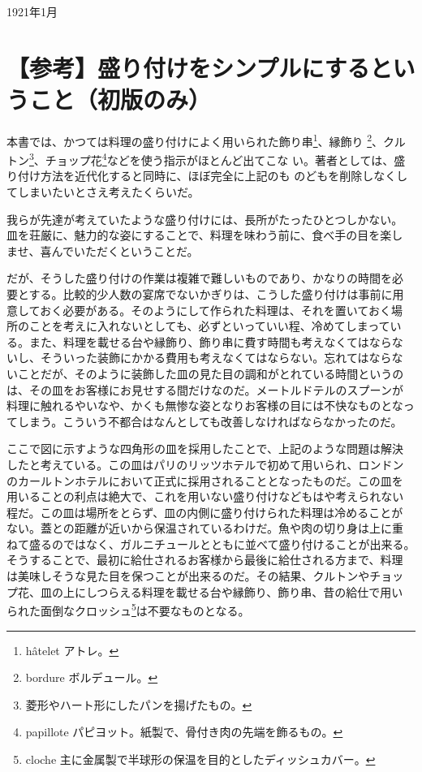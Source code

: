 \begin{flushright}
1921年1月
\end{flushright}

\newpage
\small
{}

\hypertarget{ux53c2ux8003ux76dbux308aux4ed8ux3051ux3092ux30b7ux30f3ux30d7ux30ebux306bux3059ux308bux3068ux3044ux3046ux3053ux3068ux521dux7248ux306eux307f}{%
\section{【参考】盛り付けをシンプルにするということ（初版のみ）}\label{ux53c2ux8003ux76dbux308aux4ed8ux3051ux3092ux30b7ux30f3ux30d7ux30ebux306bux3059ux308bux3068ux3044ux3046ux3053ux3068ux521dux7248ux306eux307f}}

本書では、かつては料理の盛り付けによく用いられた飾り串\footnote{hâtelet
  アトレ。}、縁飾り \footnote{bordure ボルデュール。}、クルトン\footnote{菱形やハート形にしたパンを揚げたもの。}、チョップ花\footnote{papillote
  パピヨット。紙製で、骨付き肉の先端を飾るもの。}などを使う指示がほとんど出てこな
い。著者としては、盛り付け方法を近代化すると同時に、ほぼ完全に上記のも
のどもを削除しなくしてしまいたいとさえ考えたくらいだ。

我らが先達が考えていたような盛り付けには、長所がたったひとつしかない。
皿を荘厳に、魅力的な姿にすることで、料理を味わう前に、食べ手の目を楽し
ませ、喜んでいただくということだ。

だが、そうした盛り付けの作業は複雑で難しいものであり、かなりの時間を必
要とする。比較的少人数の宴席でないかぎりは、こうした盛り付けは事前に用
意しておく必要がある。そのようにして作られた料理は、それを置いておく場
所のことを考えに入れないとしても、必ずといっていい程、冷めてしまってい
る。また、料理を載せる台や縁飾り、飾り串に費す時間も考えなくてはならな
いし、そういった装飾にかかる費用も考えなくてはならない。忘れてはならな
いことだが、そのように装飾した皿の見た目の調和がとれている時間というの
は、その皿をお客様にお見せする間だけなのだ。メートルドテルのスプーンが
料理に触れるやいなや、かくも無惨な姿となりお客様の目には不快なものとなっ
てしまう。こういう不都合はなんとしても改善しなければならなかったのだ。

ここで図に示すような四角形の皿を採用したことで、上記のような問題は解決
したと考えている。この皿はパリのリッツホテルで初めて用いられ、ロンドン
のカールトンホテルにおいて正式に採用されることとなったものだ。この皿を
用いることの利点は絶大で、これを用いない盛り付けなどもはや考えられない
程だ。この皿は場所をとらず、皿の内側に盛り付けられた料理は冷めることが
ない。蓋との距離が近いから保温されているわけだ。魚や肉の切り身は上に重
ねて盛るのではなく、ガルニチュールとともに並べて盛り付けることが出来る。
そうすることで、最初に給仕されるお客様から最後に給仕される方まで、料理
は美味しそうな見た目を保つことが出来るのだ。その結果、クルトンやチョッ
プ花、皿の上にしつらえる料理を載せる台や縁飾り、飾り串、昔の給仕で用い
られた面倒なクロッシュ\footnote{cloche
  主に金属製で半球形の保温を目的としたディッシュカバー。}は不要なものとなる。

